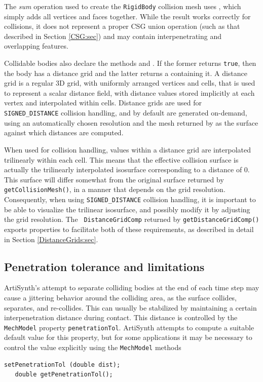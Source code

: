 \begin{sideblock}
The {\it sum} operation used to create the {\tt RigidBody} collision
mesh uses , which simply
adds all vertices and faces together. While the result works
correctly for collisions, it does not represent a proper CSG union
operation (such as that described in Section \ref{CSG:sec}) and may
contain interpenetrating and overlapping features.
\end{sideblock}

Collidable bodies also declare the methods
and
.
If the former returns {\tt true}, then the body has a distance grid
and the latter returns a 
containing it.  A distance grid is a regular 3D grid, with uniformly
arranged vertices and cells, that is used to represent a scalar
distance field, with distance values stored implicitly at each vertex
and interpolated within cells. Distance grids are used for {\tt
SIGNED\_DISTANCE} collision handling, and by default are generated
on-demand, using an automatically chosen resolution and the mesh
returned by
as the surface against which distances are computed.

When used for collision handling, values within a distance grid are
interpolated trilinearly within each cell. This means that the
effective collision surface is actually the trilinearly interpolated
isosurface corresponding to a distance of 0. This surface will differ
somewhat from the original surface returned by {\tt
getCollisionMesh()}, in a manner that depends on the grid resolution.
Consequently, when using {\tt SIGNED\_DISTANCE} collision handling, it
is important to be able to visualize the trilinear isosurface, and
possibly modify it by adjusting the grid resolution. The {\tt
DistanceGridComp} returned by {\tt getDistanceGridComp()} exports
properties to facilitate both of these requirements, as described in
detail in Section \ref{DistanceGrids:sec}.

\subsection{Penetration tolerance and limitations}
\label{ContactLimitations:sec}

ArtiSynth's attempt to separate colliding bodies at the end of each
time step may cause a jittering behavior around the colliding area, as
the surface collides, separates, and re-collides.  This can usually be
stabilized by maintaining a certain interpenetration distance during
contact. This distance is controlled by the {\tt MechModel} property
{\tt penetrationTol}.  ArtiSynth attempts to compute a suitable
default value for this property, but for some applications it may be
necessary to control the value explicitly using the {\tt MechModel}
methods
%
\begin{lstlisting}[]
   setPenetrationTol (double dist);
   double getPenetrationTol();
\end{lstlisting}
%

